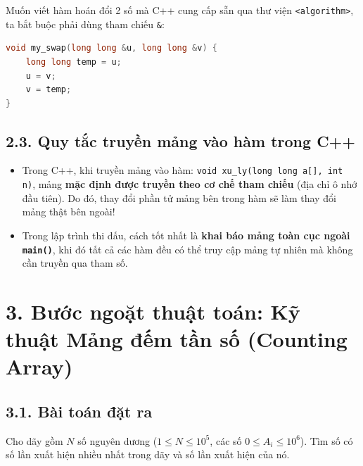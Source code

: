 \documentclass[11pt,a4paper]{article}
\begin{document}
\begin{tcolorbox}[colback=AsianLightBlue,colframe=AsianBlue,arc=1.5mm,title=\textbf{\small ỨNG DỤNG KINH ĐIỂN: HÀM TỰ ĐỔI CHỖ HAI SỐ (MY\_SWAP)}]
\footnotesize
Muốn viết hàm hoán đổi 2 số mà C++ cung cấp sẵn qua thư viện \texttt{<algorithm>}, ta bắt buộc phải dùng tham chiếu \texttt{\&}:
\begin{lstlisting}[language=C++]
void my_swap(long long &u, long long &v) {
    long long temp = u;
    u = v;
    v = temp;
}
\end{lstlisting}
\end{tcolorbox}

\vspace{-0.2cm}
\subsection*{\color{AsianBlue}\small 2.3. Quy tắc truyền mảng vào hàm trong C++}
\begin{itemize}
    \setlength{\itemsep}{1pt}
    \footnotesize
    \item Trong C++, khi truyền mảng vào hàm: \texttt{void xu\_ly(long long a[], int n)}, mảng \textbf{mặc định được truyền theo cơ chế tham chiếu} (địa chỉ ô nhớ đầu tiên). Do đó, thay đổi phần tử mảng bên trong hàm sẽ làm thay đổi mảng thật bên ngoài!
    \item Trong lập trình thi đấu, cách tốt nhất là \textbf{khai báo mảng toàn cục ngoài \texttt{main()}}, khi đó tất cả các hàm đều có thể truy cập mảng tự nhiên mà không cần truyền qua tham số.
\end{itemize}

\newpage
\section*{\color{AsianDarkBlue}\normalsize 3. Bước ngoặt thuật toán: Kỹ thuật Mảng đếm tần số (Counting Array)}

\subsection*{\color{AsianBlue}\small 3.1. Bài toán đặt ra}
Cho dãy gồm $N$ số nguyên dương ($1 \le N \le 10^5$, các số $0 \le A_i \le 10^6$). Tìm số có số lần xuất hiện nhiều nhất trong dãy và số lần xuất hiện của nó.
\end{document}
